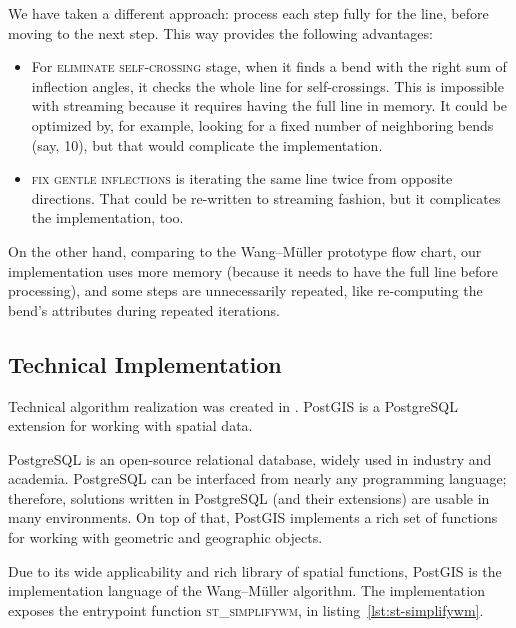 \documentclass[a4paper]{article}
\newcommand{\titlecite}[1]{\citetitle{#1}\cite{#1}}
\newcommand{\WM}{Wang--M{\"u}ller}
\begin{document}
We have taken a different approach: process each step fully for the line,
before moving to the next step. This way provides the following advantages:

\begin{itemize}

    \item For \textsc{eliminate self-crossing} stage, when it finds a bend with
        the right sum of inflection angles, it checks the whole line for
        self-crossings. This is impossible with streaming because it requires
        having the full line in memory. It could be optimized by, for example,
        looking for a fixed number of neighboring bends (say, 10), but that
        would complicate the implementation.

    \item \textsc{fix gentle inflections} is iterating the same line twice from
        opposite directions. That could be re-written to streaming fashion, but
        it complicates the implementation, too.

\end{itemize}
On the other hand, comparing to the {\WM} prototype flow chart, our
implementation uses more memory (because it needs to have the full line before
processing), and some steps are unnecessarily repeated, like re-computing the
bend's attributes during repeated iterations.

\subsection{Technical Implementation}
\label{sec:technical-implementation}

Technical algorithm realization was created in \titlecite{postgis311}. PostGIS
is a PostgreSQL extension for working with spatial data.

PostgreSQL is an open-source relational database, widely used in industry and
academia. PostgreSQL can be interfaced from nearly any programming language;
therefore, solutions written in PostgreSQL (and their extensions) are usable in
many environments. On top of that, PostGIS implements a rich set of
functions\cite{postgisref} for working with geometric and geographic objects.

Due to its wide applicability and rich library of spatial functions, PostGIS is
the implementation language of the {\WM} algorithm. The implementation exposes
the entrypoint function \textsc{st\_simplifywm}, in
listing~\ref{lst:st-simplifywm}.
\end{document}
